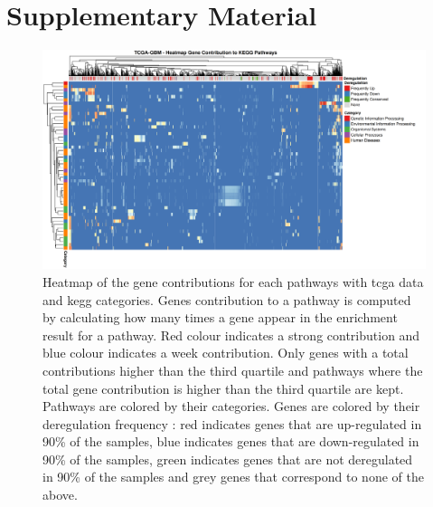 \section{Supplementary Material}

\begin{figure}[h]
    \centering
    \includegraphics[width=\textwidth]{img/gene_contrib_kegg_tcga}
    \caption {
        Heatmap of the gene contributions for each pathways with \acrshort{tcga} data and \acrshort{kegg} categories.
        Genes contribution to a pathway is computed by calculating how many times a gene appear in the enrichment result for a pathway.
        Red colour indicates a strong contribution and blue colour indicates a week contribution.
        Only genes with a total contributions higher than the third quartile and pathways where the total gene contribution is higher than the third quartile are kept.
        Pathways are colored by their categories.
        Genes are colored by their deregulation frequency : red indicates genes that are up-regulated in 90\% of the samples, blue indicates genes that are down-regulated in 90\% of the samples, green indicates genes that are not deregulated in 90\% of the samples and grey genes that correspond to none of the above.
    }
    \label{supp:gene-contrib-kegg-tcga}

\end{figure}

